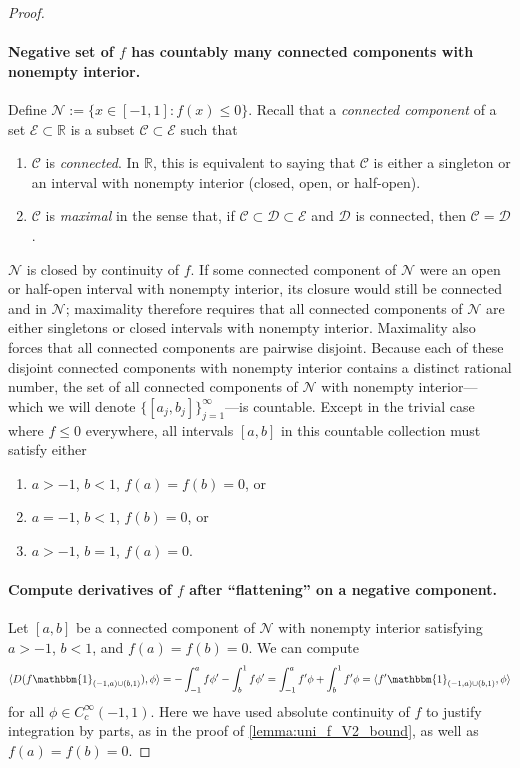 \documentclass{article}
\def\cC{{\mathcal{C}}}
\def\cD{{\mathcal{D}}}
\def\cE{{\mathcal{E}}}
\def\cN{{\mathcal{N}}}
\def\bR{{\mathbb{R}}}
\newcommand{\R}{\mathbb{R}}
\begin{document}
\begin{appendices}
\begin{proof}
    \paragraph{Negative set of $f$ has countably many connected components with nonempty interior.} Define $\cN := \{ x \in [-1,1]: f(x) \leq 0 \}$. Recall that a \textit{connected component} of a set $\cE \subset \R$ is a subset $\cC \subset \cE$ such that
    \begin{enumerate}
        \item $\cC$ is \textit{connected}. In $\bR$, this is equivalent to saying that $\cC$ is either a singleton or an interval with nonempty interior (closed, open, or half-open).
        \item $\cC$ is \textit{maximal} in the sense that, if $\cC \subset \cD \subset \cE$ and $\cD$ is connected, then $\cC = \cD$.
    \end{enumerate}
    $\cN$ is closed by continuity of $f$. If some connected component of $\cN$ were an open or half-open interval with nonempty interior, its closure would still be connected and in $\cN$; maximality therefore requires that all connected components of $\cN$ are either singletons or closed intervals with nonempty interior. Maximality also forces that all connected components are pairwise disjoint. Because each of these disjoint connected components with nonempty interior contains a distinct rational number, the set of all connected components of $\cN$ with nonempty interior---which we will denote $\{ [a_j, b_j ] \}_{j=1}^\infty$---is countable. Except in the trivial case where $f \leq 0$ everywhere, all intervals $[a,b]$ in this countable collection must satisfy either
    \begin{enumerate}
        \item $a > -1$, $b < 1$, $f(a) = f(b) = 0$, or
        \item $a = -1$, $b < 1$, $f(b) = 0$, or
        \item $a > -1$, $b = 1$, $f(a) = 0$.
    \end{enumerate}
    \paragraph{Compute derivatives of $f$ after ``flattening'' on a negative component.} Let $[a,b]$ be a connected component of $\cN$ with nonempty interior satisfying $a > -1$, $b < 1$, and $f(a) = f(b) = 0$. We can compute
    \begin{align} \label{eq:Df}
        \langle D(f \mathbbm{1}_{(-1,a) \cup (b,1)}), \phi \rangle = - \int_{-1}^a f \phi' - \int_b^1 f \phi' = \int_{-1}^a f' \phi + \int_b^1 f' \phi = \langle f' \mathbbm{1}_{(-1,a) \cup (b,1)}, \phi \rangle
    \end{align}
    for all $\phi \in C_c^\infty(-1,1)$. Here we have used absolute continuity of $f$ to justify integration by parts, as in the proof of \cref{lemma:uni_f_V2_bound}, as well as $f(a) = f(b) = 0$. 


\end{proof}
\end{appendices}
\end{document}
